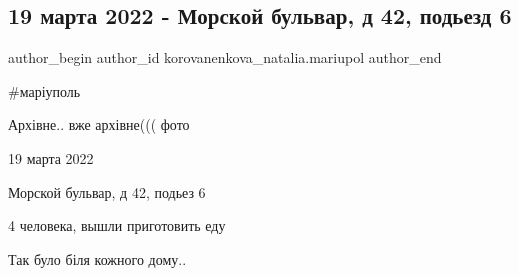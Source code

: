  
 
 
 
 

\subsection{19 марта 2022 - Морской бульвар, д 42, подьезд 6}
\label{sec:19_01_2023.fb.korovanenkova_natalia.mariupol.1.19_marta_2022___mors}

\ifcmt
 author_begin
   author_id korovanenkova_natalia.mariupol
 author_end
\fi

\#маріуполь

Архівне.. вже архівне((( фото

19 марта 2022

Морской бульвар, д 42, подьез 6

4 человека, вышли приготовить еду

Так було біля кожного дому..

